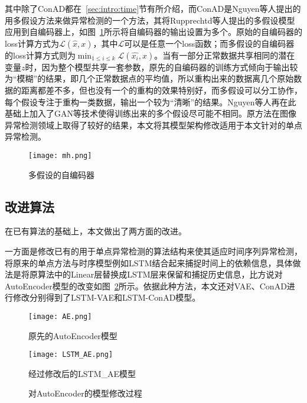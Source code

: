 其中除了ConAD都在~\ref{sec:intro:time}节有所介绍，而ConAD是Nguyen等人\cite{nguyen2018anomaly}提出的用多假设方法来做异常检测的一个方法，其将Rupprechtd等人\cite{DBLP:conf/iccv/RupprechtLDB17}提出的多假设模型应用到自编码器上，如图~\ref{fig:mh}所示将自编码器的输出设置为多个。原始的自编码器的loss计算方式为$\mathcal{L}(\hat{x},x)$，其中$\mathcal{L}$可以是任意一个loss函数；而多假设的自编码器的loss计算方式则为$\min_{1\leq i\leq k}\mathcal{L}(\hat{x_i},x)$。当有一部分正常数据共享相同的潜在变量$z$时，因为整个模型共享一套参数，原先的自编码器的训练方式倾向于输出较为“模糊”的结果，即几个正常数据点的平均值，所以重构出来的数据离几个原始数据的距离都差不多，但也没有一个的重构的效果特别好，而多假设可以分工协作，每个假设专注于重构一类数据，输出一个较为“清晰”的结果。Nguyen等人\cite{nguyen2018anomaly}再在此基础上加入了GAN\cite{DBLP:conf/nips/GoodfellowPMXWOCB14}等技术使得训练出来的多个假设尽可能不相同。原方法在图像异常检测领域上取得了较好的结果，本文将其模型架构修改适用于本文针对的单点异常检测。

\begin{figure}[htbp]
  \centering
  \texttt{[image: mh.png]}
  \caption{多假设的自编码器}
  \label{fig:mh}
\end{figure}

\subsection{改进算法}
在已有算法的基础上，本文做出了两方面的改进。

一方面是修改已有的用于单点异常检测的算法结构来使其适应时间序列异常检测，将原来的单点方法与时序模型例如LSTM结合起来捕捉时间上的依赖信息，具体做法是将原算法中的Linear层替换成LSTM层来保留和捕捉历史信息，比方说对AutoEncoder模型的改变如图~\ref{fig:lstm_ae}所示。依据此种方法，本文还对VAE、ConAD进行修改分别得到了LSTM-VAE和LSTM-ConAD模型。

\begin{figure}[htbp]
  \begin{minipage}[t]{0.5\linewidth}
  \centering
  \texttt{[image: AE.png]}
  \caption*{原先的AutoEncoder模型}
  \end{minipage}
  \begin{minipage}[t]{0.5\linewidth}
  \centering
  \texttt{[image: LSTM\_AE.png]}
  \caption*{经过修改后的LSTM\_AE模型}
  \end{minipage}
  \caption{对AutoEncoder的模型修改过程}
  \label{fig:lstm_ae}
\end{figure}

